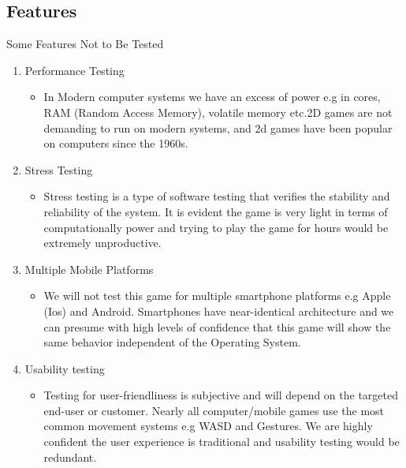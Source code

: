 

\subsection{Features}


\centerline{Some Features Not to Be Tested
}

\begin{enumerate}
   \item Performance Testing 
   \begin{itemize}
     \item  In Modern computer systems we have an excess of power e.g in cores, RAM (Random Access Memory), volatile memory etc.2D games are not demanding to run on modern systems, and 2d games have been popular on computers since the 1960s.
   \end{itemize}
  
  \item Stress Testing
   \begin{itemize}
     \item Stress testing is a type of software testing that verifies the stability and reliability of the system. It is evident the game is very light in terms of computationally power and trying to play the game for hours would be extremely unproductive.

   \end{itemize}

     \item Multiple Mobile Platforms
   \begin{itemize}
     \item We will not test this game for multiple smartphone platforms e.g Apple (Ios) and Android. Smartphones have near-identical architecture and we can presume with high levels of confidence that this game will show the same behavior independent of the Operating System.
   \end{itemize}



 \item Usability testing
   \begin{itemize}
 	\item 
 	 Testing for user-friendliness is subjective and will depend on the targeted end-user or customer. Nearly all computer/mobile games use the most common movement systems e.g WASD and Gestures. We are highly confident the user experience is traditional and usability testing would be redundant.
 	 \end{itemize}
\end{enumerate}
